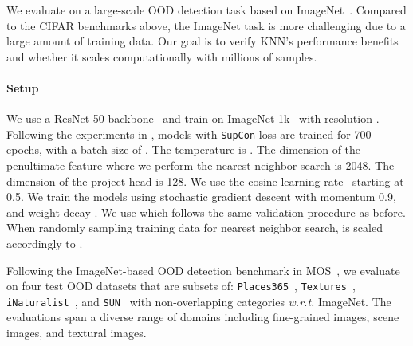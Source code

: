 \documentclass[nohyperref]{article}
\newcommand{\method}{{KNN}}
\theoremstyle{plain}
\theoremstyle{definition}
\theoremstyle{remark}
\begin{document}
We evaluate on a large-scale OOD detection task based on ImageNet~\citep{deng2009imagenet}. Compared to the CIFAR benchmarks above, the ImageNet task is more challenging due to a large amount of training data. Our goal is to verify \method's performance benefits and whether it scales computationally with millions of samples.


\paragraph{Setup} We use a ResNet-50 backbone~\citep{he2016identity} and train on ImageNet-1k~\citep{deng2009imagenet} with resolution . Following the experiments in \citeauthor{2020supcon}, models with \texttt{SupCon} loss are trained for 700 epochs, with a batch size of . The temperature  is . The dimension of the penultimate feature where we perform the nearest neighbor search is 2048. The dimension of the project head is 128. We use the cosine learning rate~\citep{loshchilov2016sgdr} starting at 0.5. We train the models using stochastic gradient descent with momentum 0.9, and weight decay  . We use  which follows the same validation procedure as before. When randomly sampling  training data for nearest neighbor search,   is scaled accordingly to .

Following the ImageNet-based OOD detection benchmark in MOS~\citep{huang2021mos}, we evaluate on four test OOD datasets that are subsets of: \texttt{Places365}~\citep{zhou2017places}, \texttt{Textures}~\citep{cimpoi2014describing}, \texttt{iNaturalist}~\citep{inat}, and \texttt{SUN}~\citep{sun} with non-overlapping categories \emph{w.r.t.} ImageNet. The evaluations span a diverse range of domains including fine-grained images, scene images, and textural images. 




\vspace{-0.2cm}
\end{document}
